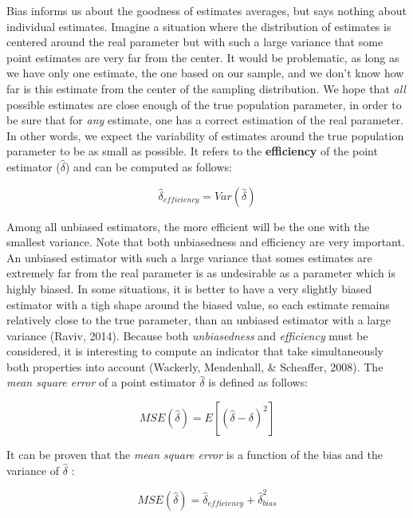 \documentclass[
  man]{apa6}
\begin{document}
Bias informs us about the goodness of estimates averages, but says nothing about individual estimates. Imagine a situation where the distribution of estimates is centered around the real parameter but with such a large variance that some point estimates are very far from the center. It would be problematic, as long as we have only one estimate, the one based on our sample, and we don't know how far is this estimate from the center of the sampling distribution. We hope that \emph{all} possible estimates are close enough of the true population parameter, in order to be sure that for \emph{any} estimate, one has a correct estimation of the real parameter. In other words, we expect the variability of estimates around the true population parameter to be as small as possible. It refers to the \textbf{efficiency} of the point estimator (\(\hat{\delta}\)) and can be computed as follows:

\begin{equation} 
\hat{\delta}_{efficiency}=Var(\hat{\delta})
\label{eq:EFFICIENCY}
\end{equation}

Among all unbiased estimators, the more efficient will be the one with the smallest variance. Note that both unbiasedness and efficiency are very important. An unbiased estimator with such a large variance that somes estimates are extremely far from the real parameter is as undesirable as a parameter which is highly biased. In some situations, it is better to have a very slightly biased estimator with a tigh shape around the biased value, so each estimate remains relatively close to the true parameter, than an unbiased estimator with a large variance (Raviv, 2014). Because both \emph{unbiasedness} and \emph{efficiency} must be considered, it is interesting to compute an indicator that take simultaneously both properties into account (Wackerly, Mendenhall, \& Scheaffer, 2008). The \emph{mean square error} of a point estimator \(\hat{\delta}\) is defined as follows:

\begin{equation} 
MSE(\hat{\delta})=E[(\hat{\delta}-\delta)^2]
\label{eq:MSE1}
\end{equation}

It can be proven that the \emph{mean square error} is a function of the bias and the variance of \(\hat{\delta}\) :

\begin{equation} 
MSE(\hat{\delta})=\hat{\delta}_{efficiency}+\hat{\delta}_{bias}^2
\label{eq:MSE2}
\end{equation}
\end{document}
